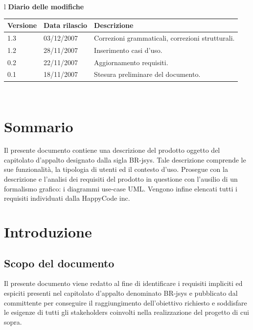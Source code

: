 \documentclass[11pt,titlepage,a4paper]{report}
\begin{document}
\begin{center}
\begin{table}[hbtp]
\large{
\begin{tabular}{l}
\Large{\textbf{\textsf{Diario delle modifiche}}} \\
\begin{tabular}{||p{2cm}||p{3.5cm}||p{6cm}||}
\hline
\textbf{Versione} & \textbf{Data rilascio} & \textbf{Descrizione} \\
\hline
1.3 & 03/12/2007 & Correzioni grammaticali, correzioni strutturali.\\
\hline
1.2 & 28/11/2007 & Inserimento casi d'uso.\\
\hline
0.2 & 22/11/2007 & Aggiornamento requisiti. \\
\hline
0.1 & 18/11/2007 & Stesura preliminare del documento. \\
\hline

\end{tabular} \\
\end{tabular}

}
\end{table}
\end{center}
\newpage

\chapter*{Sommario} 
Il presente documento contiene una descrizione del prodotto oggetto del capitolato d'appalto designato dalla sigla BR-jsys. Tale descrizione comprende le sue funzionalit\`a, la tipologia di utenti ed il contesto d'uso. Prosegue con la descrizione e l'analisi dei requisiti del prodotto in questione con l'ausilio di un formalismo grafico: i diagrammi use-case UML. Vengono infine elencati tutti i requisiti individuati dalla HappyCode inc.

\tableofcontents
\chapter{Introduzione}
\section{Scopo del documento}
Il presente documento viene redatto al fine di identificare i requisiti impliciti ed espiciti presenti nel capitolato d'appalto denominato BR-jsys e pubblicato dal committente per conseguire il raggiungimento dell'obiettivo richiesto e soddisfare le esigenze di tutti gli stakeholders coinvolti nella realizzazione del progetto di cui sopra.
\end{document}
